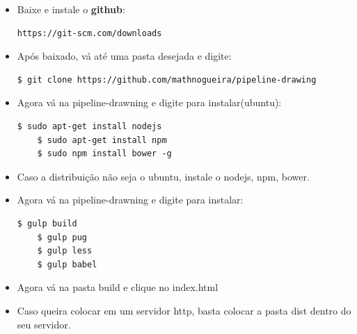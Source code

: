 \documentclass{article}
\begin{document}
	\begin{itemize}
	\item Baixe e instale o \textbf{github}: 
	\begin{lstlisting}[style=DOS]
	 https://git-scm.com/downloads
\end{lstlisting}
	\item Após baixado, vá até uma pasta desejada e digite:
	\begin{lstlisting}[style=DOS]
	$ git clone https://github.com/mathnogueira/pipeline-drawing
\end{lstlisting}
	\item Agora vá na pipeline-drawning e digite para instalar(ubuntu):
	\begin{lstlisting}[style=DOS]
	$ sudo apt-get install nodejs
	$ sudo apt-get install npm
	$ sudo npm install bower -g
\end{lstlisting}
	\item Caso a distribuição não seja o ubuntu, instale o nodejs, npm, bower.
	\item Agora vá na pipeline-drawning e digite para instalar:
	\begin{lstlisting}[style=DOS]
	$ gulp build
	$ gulp pug
	$ gulp less
	$ gulp babel
\end{lstlisting}
	\item Agora vá na pasta build e clique no index.html
	\item Caso queira colocar em um servidor http, basta colocar a pasta dist dentro do seu servidor.


 \end{itemize}
\end{document}
